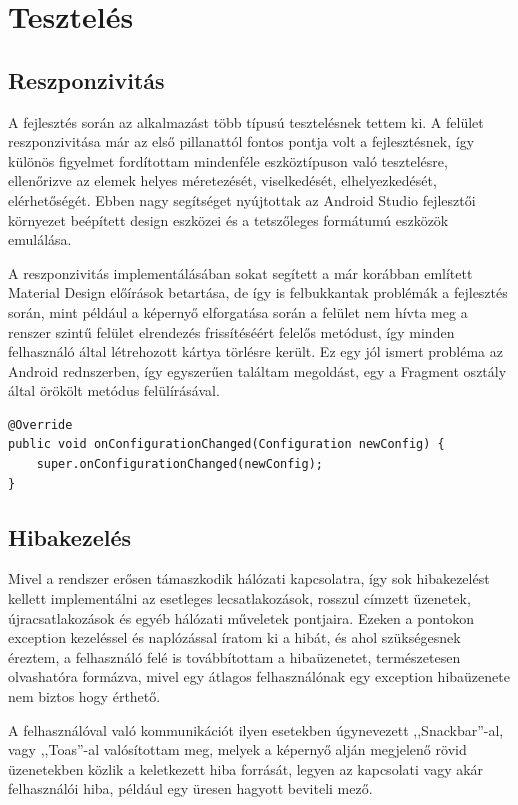 \documentclass[
]{thesis-ekf}
\theoremstyle{definition}
\theoremstyle{remark}
\begin{document}
\section{Tesztelés}

\subsection{Reszponzivitás}
A fejlesztés során az alkalmazást több típusú tesztelésnek tettem ki. A felület reszponzivitása már az első pillanattól
fontos pontja volt a fejlesztésnek, így különös figyelmet fordítottam mindenféle eszköztípuson való tesztelésre, ellenőrizve
az elemek helyes méretezését, viselkedését, elhelyezkedését, elérhetőségét. Ebben nagy segítséget nyújtottak az 
Android Studio fejlesztői környezet beépített design eszközei és a tetszőleges formátumú eszközök emulálása. 

A reszponzivitás implementálásában sokat segített a már korábban említett Material Design\cite{material} előírások betartása,
de így is felbukkantak problémák a fejlesztés során, mint például a képernyő elforgatása során a felület 
nem hívta meg a renszer szintű felület elrendezés frissítéséért felelős metódust, 
így minden felhasználó által létrehozott kártya törlésre került. Ez egy jól ismert probléma az Android rednszerben, 
így egyszerűen találtam megoldást, egy a Fragment osztály által örökölt metódus felülírásával.

\lstset{language=Java}  
\begin{lstlisting}[frame=single]
@Override
public void onConfigurationChanged(Configuration newConfig) {
	super.onConfigurationChanged(newConfig);
}
\end{lstlisting}
\subsection{Hibakezelés}
Mivel a rendszer erősen támaszkodik hálózati kapcsolatra, így sok hibakezelést kellett implementálni az esetleges
lecsatlakozások, rosszul címzett üzenetek, újracsatlakozások és egyéb hálózati műveletek pontjaira. Ezeken a pontokon
exception kezeléssel és naplózással íratom ki a hibát, és ahol szükségesnek éreztem, a felhasználó felé is továbbítottam
a hibaüzenetet, természetesen olvashatóra formázva, mivel egy átlagos felhasználónak egy exception hibaüzenete
nem biztos hogy érthető. 

A felhasználóval való kommunikációt ilyen esetekben úgynevezett ,,Snackbar''-al, vagy ,,Toas''-al
valósítottam meg, melyek a képernyő alján megjelenő rövid üzenetekben közlik a keletkezett hiba forrását, legyen az
kapcsolati vagy akár felhasználói hiba, például egy üresen hagyott beviteli mező.
\end{document}
